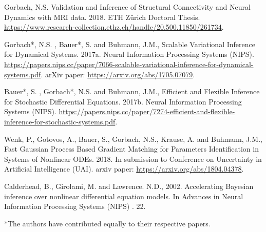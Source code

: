 \begin{par}
Gorbach, N.S.  Validation and Inference of Structural Connectivity and Neural Dynamics with MRI data. 2018. ETH Z\"{u}rich Doctoral Thesis. \href{https://www.research-collection.ethz.ch/handle/20.500.11850/261734}{https://www.research-collection.ethz.ch/handle/20.500.11850/261734}. 
\end{par} \vspace{2em}
\begin{par}
Gorbach*, N.S. , Bauer*, S. and Buhmann, J.M., Scalable Variational Inference for Dynamical Systems. 2017a. Neural Information Processing Systems (NIPS). \href{https://papers.nips.cc/paper/7066-scalable-variational-inference-for-dynamical-systems.pdf}{https://papers.nips.cc/paper/7066-scalable-variational-inference-for-dynamical-systems.pdf}. arXiv paper:  \href{https://arxiv.org/abs/1705.07079}{https://arxiv.org/abs/1705.07079}.
\end{par} \vspace{2em}
\begin{par}
Bauer*, S. , Gorbach*, N.S. and Buhmann, J.M., Efficient and Flexible Inference for Stochastic Differential Equations. 2017b. Neural Information Processing Systems (NIPS). \href{https://papers.nips.cc/paper/7274-efficient-and-flexible-inference-for-stochastic-systems.pdf}{https://papers.nips.cc/paper/7274-efficient-and-flexible-inference-for-stochastic-systems.pdf}.
\end{par} \vspace{2em}
\begin{par}
Wenk, P., Gotovos, A., Bauer, S., Gorbach, N.S., Krause, A. and Buhmann, J.M., Fast Gaussian Process Based Gradient Matching for Parameters Identification in Systems of Nonlinear ODEs. 2018. In submission to Conference on Uncertainty in Artificial Intelligence (UAI). arxiv paper: \href{https://arXiv.org/abs/1804.04378}{https://arxiv.org/abs/1804.04378}.
\end{par} \vspace{2em}
\begin{par}
Calderhead, B., Girolami, M. and Lawrence. N.D., 2002. Accelerating Bayesian inference over nonlinear differential equation models. In Advances in Neural Information Processing Systems (NIPS) . 22.
\end{par} \vspace{3em}
\begin{par}
*The authors have contributed equally to their respective papers.
\end{par} 